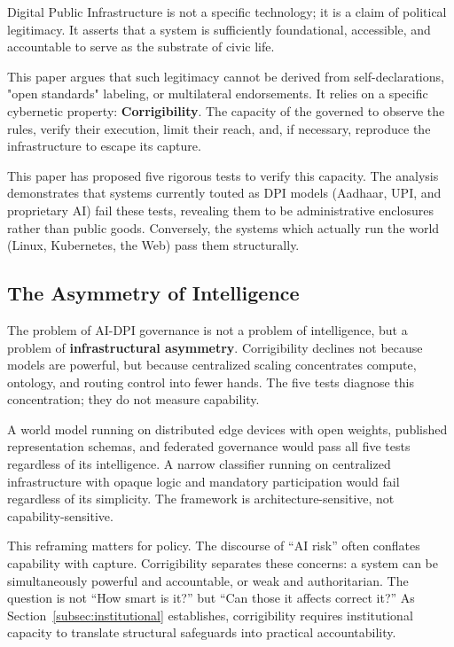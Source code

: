 \documentclass{article}
\begin{document}
Digital Public Infrastructure is not a specific technology; it is a claim of political legitimacy. It asserts that a system is sufficiently foundational, accessible, and accountable to serve as the substrate of civic life.

This paper argues that such legitimacy cannot be derived from self-declarations, "open standards" labeling, or multilateral endorsements. It relies on a specific cybernetic property: \textbf{Corrigibility}. The capacity of the governed to observe the rules, verify their execution, limit their reach, and, if necessary, reproduce the infrastructure to escape its capture.

This paper has proposed five rigorous tests to verify this capacity. The analysis demonstrates that systems currently touted as DPI models (Aadhaar, UPI, and proprietary AI) fail these tests, revealing them to be administrative enclosures rather than public goods. Conversely, the systems which actually run the world (Linux, Kubernetes, the Web) pass them structurally.

\subsection{The Asymmetry of Intelligence}

The problem of AI-DPI governance is not a problem of intelligence, but a problem of \textbf{infrastructural asymmetry}. Corrigibility declines not because models are powerful, but because centralized scaling concentrates compute, ontology, and routing control into fewer hands. The five tests diagnose this concentration; they do not measure capability.

A world model running on distributed edge devices with open weights, published representation schemas, and federated governance would pass all five tests regardless of its intelligence. A narrow classifier running on centralized infrastructure with opaque logic and mandatory participation would fail regardless of its simplicity. The framework is architecture-sensitive, not capability-sensitive.

This reframing matters for policy. The discourse of ``AI risk'' often conflates capability with capture. Corrigibility separates these concerns: a system can be simultaneously powerful and accountable, or weak and authoritarian. The question is not ``How smart is it?'' but ``Can those it affects correct it?'' As Section~\ref{subsec:institutional} establishes, corrigibility requires institutional capacity to translate structural safeguards into practical accountability.
\end{document}
